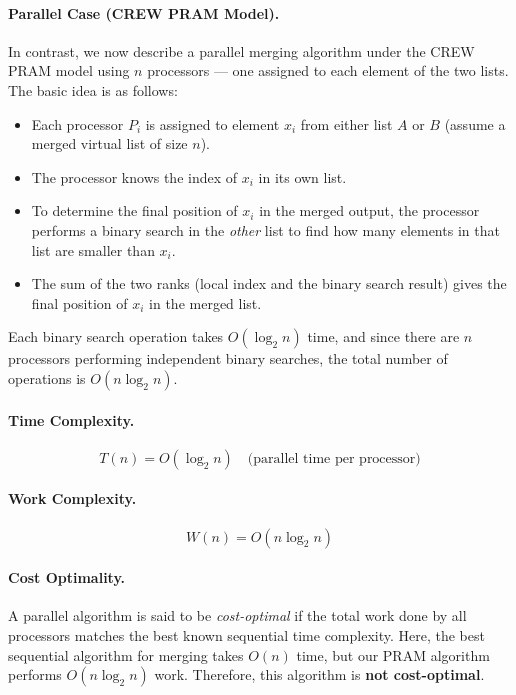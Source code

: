 \documentclass[12pt]{book}
\begin{document}
\paragraph{Parallel Case (CREW PRAM Model).}  
In contrast, we now describe a parallel merging algorithm under the CREW PRAM model using $n$ processors — one assigned to each element of the two lists. The basic idea is as follows:

\begin{itemize}
    \item Each processor $P_i$ is assigned to element $x_i$ from either list $A$ or $B$ (assume a merged virtual list of size $n$).
    \item The processor knows the index of $x_i$ in its own list.
    \item To determine the final position of $x_i$ in the merged output, the processor performs a binary search in the \emph{other} list to find how many elements in that list are smaller than $x_i$.
    \item The sum of the two ranks (local index and the binary search result) gives the final position of $x_i$ in the merged list.
\end{itemize}

Each binary search operation takes $O(\log_2 n)$ time, and since there are $n$ processors performing independent binary searches, the total number of operations is $O(n \log_2 n)$.

\paragraph{Time Complexity.}
\[
T(n) = O(\log_2 n) \quad \text{(parallel time per processor)}
\]

\paragraph{Work Complexity.}
\[
W(n) = O(n \log_2 n)
\]

\paragraph{Cost Optimality.}  
A parallel algorithm is said to be \textit{cost-optimal} if the total work done by all processors matches the best known sequential time complexity. Here, the best sequential algorithm for merging takes $O(n)$ time, but our PRAM algorithm performs $O(n \log_2 n)$ work. Therefore, this algorithm is \textbf{not cost-optimal}.
\end{document}
